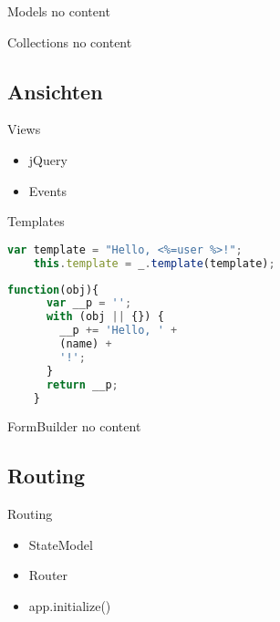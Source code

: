 \begin{frame}{Models}
  no content
\end{frame}

\begin{frame}{Collections}
  no content
\end{frame}

\subsection{Ansichten}

\begin{frame}{Views}
  \begin{itemize}
    \item jQuery
    \item Events
  \end{itemize}
\end{frame}

\begin{frame}[fragile]{Templates}
  \begin{lstlisting}[language=JavaScript,gobble=4]
    var template = "Hello, <%=user %>!";
    this.template = _.template(template);
  \end{lstlisting}
  
  \begin{lstlisting}[language=JavaScript,gobble=4]
    function(obj){
      var __p = '';
      with (obj || {}) {
        __p += 'Hello, ' +
        (name) +
        '!';
      }
      return __p;
    }
  \end{lstlisting}
\end{frame}

\begin{frame}{FormBuilder}
  no content
\end{frame}

\subsection{Routing}

\begin{frame}{Routing}
  \begin{itemize}
    \item StateModel
    \item Router
    \item app.initialize()
  \end{itemize}
\end{frame}

